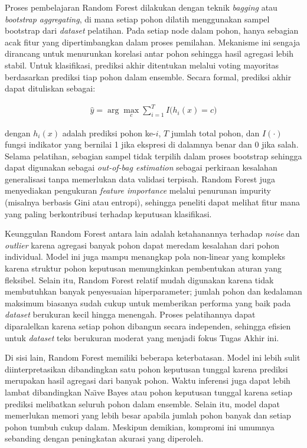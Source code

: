 Proses pembelajaran Random Forest dilakukan dengan teknik \textit{bagging} atau \textit{bootstrap aggregating}, di mana setiap pohon dilatih menggunakan sampel bootstrap dari \textit{dataset} pelatihan. Pada setiap node dalam pohon, hanya sebagian acak fitur yang dipertimbangkan dalam proses pemilahan. Mekanisme ini sengaja dirancang untuk menurunkan korelasi antar pohon sehingga hasil agregasi lebih stabil. Untuk klasifikasi, prediksi akhir ditentukan melalui voting mayoritas berdasarkan prediksi tiap pohon dalam ensemble. Secara formal, prediksi akhir dapat dituliskan sebagai:

\begin{align}
\hat{y} = \arg\max_{c} \sum_{i=1}^{T} I\bigl(h_i(x) = c\bigr) \label{eq=rumus-random-forest}
\end{align}

dengan $h_i(x)$ adalah prediksi pohon ke-$i$, $T$ jumlah total pohon, dan $I(\cdot)$ fungsi indikator yang bernilai 1 jika ekspresi di dalamnya benar dan 0 jika salah. Selama pelatihan, sebagian sampel tidak terpilih dalam proses bootstrap sehingga dapat digunakan sebagai \textit{out-of-bag estimation} sebagai perkiraan kesalahan generalisasi tanpa memerlukan data validasi terpisah. Random Forest juga menyediakan pengukuran \textit{feature importance} melalui penurunan impurity (misalnya berbasis Gini atau entropi), sehingga peneliti dapat melihat fitur mana yang paling berkontribusi terhadap keputusan klasifikasi.

Keunggulan Random Forest antara lain adalah ketahanannya terhadap \textit{noise} dan \textit{outlier} karena agregasi banyak pohon dapat meredam kesalahan dari pohon individual. Model ini juga mampu menangkap pola non-linear yang kompleks karena struktur pohon keputusan memungkinkan pembentukan aturan yang fleksibel. Selain itu, Random Forest relatif mudah digunakan karena tidak membutuhkan banyak penyesuaian hiperparameter; jumlah pohon dan kedalaman maksimum biasanya sudah cukup untuk memberikan performa yang baik pada \textit{dataset} berukuran kecil hingga menengah. Proses pelatihannya dapat diparalelkan karena setiap pohon dibangun secara independen, sehingga efisien untuk \textit{dataset} teks berukuran moderat yang menjadi fokus Tugas Akhir ini.

Di sisi lain, Random Forest memiliki beberapa keterbatasan. Model ini lebih sulit diinterpretasikan dibandingkan satu pohon keputusan tunggal karena prediksi merupakan hasil agregasi dari banyak pohon. Waktu inferensi juga dapat lebih lambat dibandingkan Na\"{\i}ve Bayes atau pohon keputusan tunggal karena setiap prediksi melibatkan seluruh pohon dalam ensemble. Selain itu, model dapat memerlukan memori yang lebih besar apabila jumlah pohon banyak dan setiap pohon tumbuh cukup dalam. Meskipun demikian, kompromi ini umumnya sebanding dengan peningkatan akurasi yang diperoleh.

